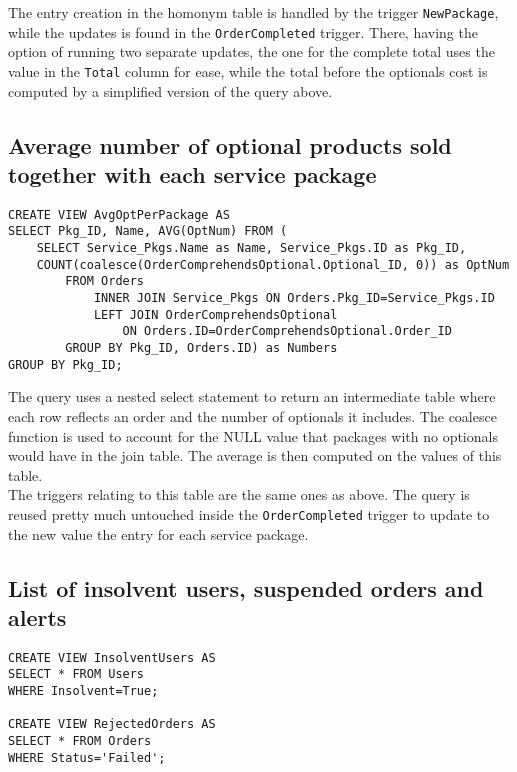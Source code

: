 The entry creation in the homonym table is handled by the trigger \texttt{NewPackage}, while the updates is found in the \texttt{OrderCompleted} trigger. There, having the option of running two separate updates, the one for the complete total uses the value in the \texttt{Total} column for ease, while the total before the optionals cost is computed by a simplified version of the query above.

\subsection{Average number of optional products sold together with each service package}

\begin{lstlisting}[style=SQL]
CREATE VIEW AvgOptPerPackage AS
SELECT Pkg_ID, Name, AVG(OptNum) FROM (
    SELECT Service_Pkgs.Name as Name, Service_Pkgs.ID as Pkg_ID,
    COUNT(coalesce(OrderComprehendsOptional.Optional_ID, 0)) as OptNum
        FROM Orders
            INNER JOIN Service_Pkgs ON Orders.Pkg_ID=Service_Pkgs.ID
            LEFT JOIN OrderComprehendsOptional
                ON Orders.ID=OrderComprehendsOptional.Order_ID
        GROUP BY Pkg_ID, Orders.ID) as Numbers
GROUP BY Pkg_ID;

\end{lstlisting}

The query uses a nested select statement to return an intermediate table where each row reflects an order and the number of optionals it includes.
The coalesce function is used to account for the NULL value that packages with no optionals would have in the join table. The average is then
computed on the values of this table.\\

The triggers relating to this table are the same ones as above. The query is reused pretty much untouched inside the \texttt{OrderCompleted}
trigger to update to the new value the entry for each service package.

\subsection{List of insolvent users, suspended orders and alerts}

\begin{lstlisting}[style=SQL]
CREATE VIEW InsolventUsers AS
SELECT * FROM Users
WHERE Insolvent=True;

CREATE VIEW RejectedOrders AS
SELECT * FROM Orders
WHERE Status='Failed';
\end{lstlisting}

